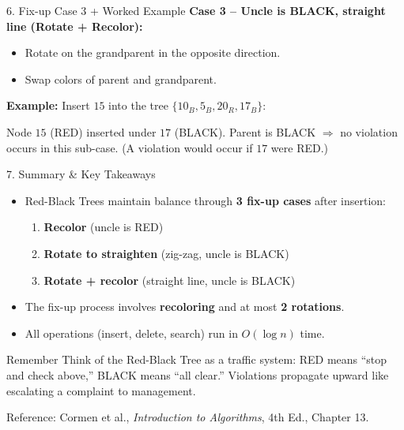 \documentclass{beamer}
\begin{document}
\begin{frame}{6. Fix-up Case 3 + Worked Example}
\textbf{Case 3 -- Uncle is BLACK, straight line (Rotate + Recolor):}
\begin{itemize}
    \item Rotate on the grandparent in the opposite direction.
    \item Swap colors of parent and grandparent.
\end{itemize}

\vspace{0.3em}
\textbf{Example:} Insert $15$ into the tree $\{10_B, 5_B, 20_R, 17_B\}$:
\begin{center}
\end{center}
\footnotesize Node $15$ (RED) inserted under $17$ (BLACK). Parent is BLACK $\Rightarrow$ no violation occurs in this sub-case. (A violation would occur if $17$ were RED.)
\end{frame}

\begin{frame}{7. Summary \& Key Takeaways}
\begin{itemize}
    \item Red-Black Trees maintain balance through \textbf{3 fix-up cases} after insertion:
    \begin{enumerate}
        \item \textbf{Recolor} (uncle is RED)
        \item \textbf{Rotate to straighten} (zig-zag, uncle is BLACK)
        \item \textbf{Rotate + recolor} (straight line, uncle is BLACK)
    \end{enumerate}
    \item The fix-up process involves \textbf{recoloring} and at most \textbf{2 rotations}.
    \item All operations (insert, delete, search) run in $O(\log n)$ time.
\end{itemize}

\begin{block}{Remember}
Think of the Red-Black Tree as a traffic system: RED means ``stop and check above,'' BLACK means ``all clear.'' Violations propagate upward like escalating a complaint to management.
\end{block}

\footnotesize{Reference: Cormen et al., \textit{Introduction to Algorithms}, 4th Ed., Chapter 13.}
\end{frame}
\end{document}
